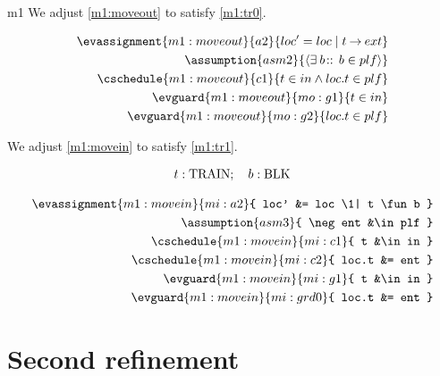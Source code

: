 \documentclass[12pt]{amsart}
\begin{document}
\begin{machine}{m1}
We adjust \ref{m1:moveout} to satisfy \ref{m1:tr0}.


\begin{align*}
\evassignment{m1:moveout}{a2}{ loc' = loc \1 | t \fun ext }
\\ \assumption{asm2}
	{ \qexists{b}{}{b \in plf} }
\\ \cschedule{m1:moveout}{c1}{ t \in in \land loc.t \in plf }
\\ \evguard{m1:moveout}{mo:g1}{ t \in in }
\\ \evguard{m1:moveout}{mo:g2}{ loc.t \in plf }
\end{align*}

We adjust \ref{m1:movein} to satisfy \ref{m1:tr1}.


\begin{align*}
\indices{m1:movein}{	t : \Train} ; \quad
\param{m1:movein}{ b : \Blk }
\end{align*}

\begin{align*}
\evassignment{m1:movein}{mi:a2}
	{ loc' &= loc \1| t \fun b }
\\ \assumption{asm3}
	{ \neg ent &\in plf }
\\ \cschedule{m1:movein}{mi:c1}{ t &\in in } 
\\ \cschedule{m1:movein}{mi:c2}{ loc.t &= ent }
\\ \evguard{m1:movein}{mi:g1}{ t &\in in }
\\ \evguard{m1:movein}{mi:grd0}
	{ loc.t &= ent } %
\end{align*}
%
\end{machine}

\section{Second refinement}
\end{document}
